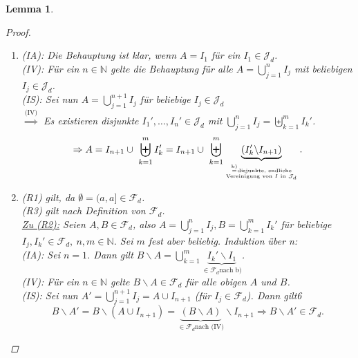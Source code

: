 \documentclass[a4paper]{scrreprt}
\newcommand{\N}{\mathbb{N}}
\newcommand{\Fd}{\mathcal{F}_d}
\newcommand{\Jd}{\mathcal{J}_d}
\newcommand{\bigdcup}{\biguplus}
\theoremstyle{plain}
\newtheorem{lem}[thm]{Lemma}
\theoremstyle{definition}
\begin{document}
{{{\begin{lem}
\begin{proof}
\begin{enumerate}
\begin{displaymath}
\begin{split}
                    \end{split}                    
                \end{displaymath}
                Nach (IV) ist dies eine disjunkte Vereinigung $\hat{I}_k \in \mathcal{J}_{d+1}$.
            \item
                (IA): Die Behauptung ist klar, wenn $A=I_1$ für ein $I_1\in \Jd$.\\
                (IV): Für ein $n \in\N$ gelte die Behauptung für alle $A = \bigcup_{j=1}^n I_j$ mit beliebigen $I_j \in \Jd$.\\
                (IS): Sei nun $A = \bigcup_{j=1}^{n+1} I_j$ für beliebige $I_j \in \Jd $\\
                $\overset{\text{(IV)}}{\Rightarrow}$ Es existieren disjunkte $I_1', \dots, I_n' \in \Jd$ mit $\bigcup_{j=1}^n I_j = \bigdcup_{k=1}^m I_k'$.
                \begin{displaymath}
                     \Rightarrow A = I_{n+1} \cup \ \bigdcup_{k=1}^m I_k' = I_{n+1} \cup \ \bigdcup_{k=1}^m \underbrace{(I_k'\backslash I_{n+1})}_{\genfrac{}{}{0pt}{}{\overset{\text{b)}}{=}\text{disjunkte, endliche}}{\text{Vereinigung von $I$ in $\Jd$}}}.
                \end{displaymath}
            \item
                (R1) gilt, da $\emptyset = (a, a] \in \Fd$.\\
                (R3) gilt nach Definition von $\Fd$.\\
                \uline{Zu (R2):} Seien $A,B \in \Fd$, also $A=\bigcup_{j=1}^n I_j, B= \bigcup_{k=1}^m I_k'$ für beliebige $I_j, I_k' \in \Fd, \ n,m \in \N$. Sei $m$ fest aber beliebig. Induktion über n:\\
                (IA): Sei $n=1$. Dann gilt $B\backslash A = \bigcup_{k=1}^m \underbrace{I_k'\backslash I_1}_{\in \Fd \text{nach b)}}$.\\
                (IV): Für ein $n \in\N$ gelte $B\backslash A \in \Fd$ für alle obigen $A$ und $B$.\\
                (IS): Sei nun $A' = \bigcup_{j=1}^{n+1} I_j = A \cup I_{n+1}$ (für $I_j \in \Fd$). Dann gilt6
                \begin{displaymath}
                    B\backslash A' = B\backslash (A \cup I_{n+1}) = \underbrace{(B \backslash A)}_{\in \Fd \text{nach (IV)}} \backslash I_{n+1} \Rightarrow B \backslash A' \in \Fd.
                \end{displaymath}
        \end{enumerate}
    \end{proof}
\end{lem}

}}}
\end{document}
